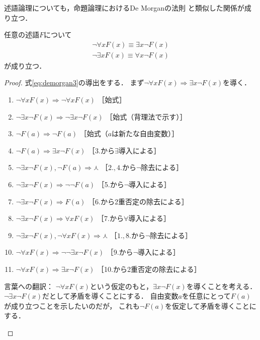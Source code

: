    述語論理についても，命題論理におけるDe Morganの法則
   と類似した関係が成り立つ．
   \begin{thm} \label{thm:demorganjutugo}
     任意の述語$F$について
     \begin{align}
       \lnot \forall x F(x) \equiv \exists x \lnot F(x)
       \label{eq:demorgan3} \\
       \lnot \exists x F(x) \equiv \forall x \lnot F(x)
       \label{eq:demorgan4}
     \end{align}
     が成り立つ．
   \end{thm}
   \begin{proof}
     式\eqref{eq:demorgan3}の導出をする．
     まず$\lnot \forall x F(x) \Longrightarrow \exists x \lnot F(x)$を導く．
     \begin{enumerate}[1. ]
       \item $\lnot \forall x F(x) \Longrightarrow \lnot \forall x F(x)$
              \quad ［始式］
       \item $\lnot \exists x \lnot F(x) \Longrightarrow \lnot \exists x \lnot F(x) $
              \quad ［始式（背理法で示す）］
       \item $\lnot F(a) \Longrightarrow \lnot F(a)$ \quad ［始式（$a$は新たな自由変数）］
       \item $\lnot F(a) \Longrightarrow \exists x \lnot F(x)$ 
              \quad ［3.から$\exists$導入による］
       \item $\lnot \exists x \lnot F(x) ,  \lnot F(a) 
              \Longrightarrow \curlywedge$ \quad ［$2., 4.$から$\lnot$除去による］
       \item $\lnot \exists x \lnot F(x) \Longrightarrow \lnot \lnot F(a)$
              \quad ［5.から$\lnot$導入による］
       \item $\lnot \exists x \lnot F(x) \Longrightarrow F(a)$
              \quad ［6.から2重否定の除去による］
       \item $\lnot \exists x \lnot F(x) \Longrightarrow \forall x F(x)$
              \quad ［7.から$\forall$導入による］
       \item $\lnot \exists x \lnot F(x) ,  \lnot \forall x F(x) 
              \Longrightarrow \curlywedge$ \quad ［$1., 8.$から$\lnot$除去による］
       \item $\lnot \forall x F(x) \Longrightarrow \lnot \lnot \exists x \lnot F(x)$
              \quad ［9.から$\lnot$導入による］
       \item $\lnot \forall x F(x) \Longrightarrow \exists x \lnot F(x)$
              \quad ［10.から2重否定の除去による］
     \end{enumerate}
     \begin{oframed}
       言葉への翻訳：
       $\lnot \forall x F(x) $という仮定のもと，$\exists x \lnot F(x)$を導くことを考える．
       $\lnot \exists x \lnot F(x)$だとして矛盾を導くことにする．
       自由変数$a$を任意にとって$F(a)$が成り立つことを示したいのだが，
       これも$\lnot F(a)$を仮定して矛盾を導くことにする．
       

\end{oframed}
\end{proof}
